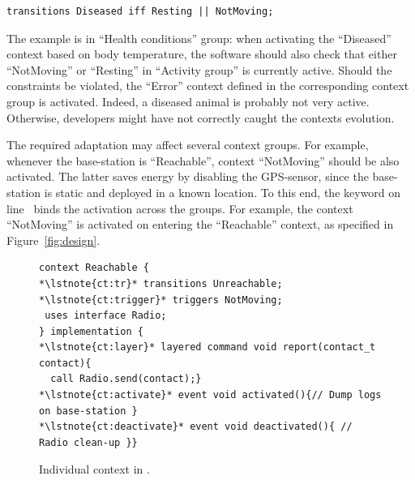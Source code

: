 \vspace{-1mm}
\begin{lstlisting}[language=conesc]
transitions Diseased iff Resting || NotMoving;
\end{lstlisting}
\vspace{-1.5mm}

The example is in ``Health conditions'' group: when activating the ``Diseased''
context based on body temperature, the software should also check that either
``NotMoving'' or ``Resting'' in ``Activity group'' is currently active. Should the
constraints be violated, the ``Error'' context defined in the corresponding
context group is activated. Indeed, a diseased animal is probably not very
active. Otherwise, developers might have not correctly caught the contexts
evolution.

The required adaptation may affect several context groups. For example, whenever
the base-station is ``Reachable'', context ``NotMoving'' should be also activated.
The latter saves energy by disabling the GPS-sensor, since the base-station is
static and deployed in a known location. To this end, the keyword
 on line~ binds the activation across the
groups. For example, the context ``NotMoving'' is activated on entering the
``Reachable'' context, as specified in Figure~\ref{fig:design}.


\begin{figure}[!tb]
\begin{lstlisting}[style=conescframe]
context Reachable {
*\lstnote{ct:tr}* transitions Unreachable;
*\lstnote{ct:trigger}* triggers NotMoving;
 uses interface Radio;
} implementation {
*\lstnote{ct:layer}* layered command void report(contact_t contact){
  call Radio.send(contact);}
*\lstnote{ct:activate}* event void activated(){// Dump logs on base-station }
*\lstnote{ct:deactivate}* event void deactivated(){ // Radio clean-up }}
\end{lstlisting}
\vspace{-3mm}
\caption{Individual context in \conesc.}
  \label{fig:context}
\vspace{-7mm}
\end{figure}
